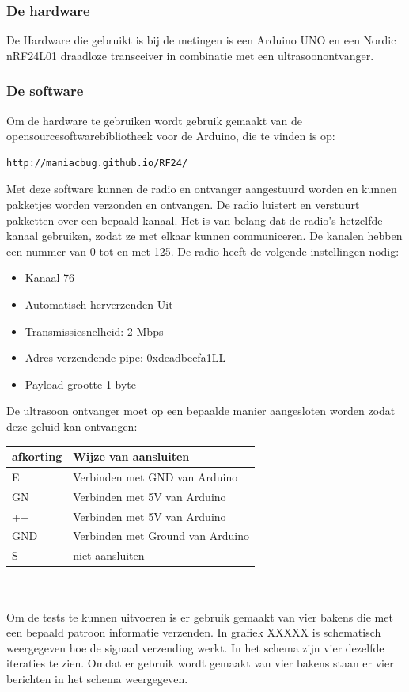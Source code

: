 \documentclass{article}
\begin{document}
\subsubsection{De hardware}
De Hardware die gebruikt is bij de metingen is een Arduino UNO en een Nordic nRF24L01 draadloze transceiver in combinatie met een ultrasoonontvanger. \\

\subsubsection{De software}
Om de hardware te gebruiken wordt gebruik gemaakt van de opensourcesoftwarebibliotheek voor de Arduino, die te vinden is op: \begin{verbatim}http://maniacbug.github.io/RF24/ \end{verbatim} 
Met deze software kunnen de radio en ontvanger aangestuurd worden en kunnen pakketjes worden verzonden en ontvangen. De radio luistert en verstuurt pakketten over een bepaald kanaal. Het is van belang dat de radio's hetzelfde kanaal gebruiken, zodat ze met elkaar kunnen communiceren. De kanalen hebben een nummer van 0 tot en met 125. De radio heeft de volgende instellingen nodig:
\begin{itemize}
	\item Kanaal 76 
	\item Automatisch herverzenden Uit
	\item Transmissiesnelheid: 2 Mbps
	\item Adres verzendende pipe: 0xdeadbeefa1LL
	\item Payload-grootte 1 byte
\end{itemize}
De ultrasoon ontvanger moet op een bepaalde manier aangesloten worden zodat deze geluid kan ontvangen:
\begin{tabular}{l| l}
\hline
afkorting & Wijze van aansluiten \\ \hline
E & Verbinden met GND van Arduino \\
GN & Verbinden met 5V van Arduino \\
++ & Verbinden met 5V van Arduino \\
GND & Verbinden met Ground van Arduino \\
S & niet aansluiten \\
\end{tabular}
\\
\\
Om de tests te kunnen uitvoeren is er gebruik gemaakt van vier bakens die met een bepaald patroon informatie verzenden. In grafiek  XXXXX is schematisch weergegeven hoe de signaal verzending werkt. In het schema zijn vier dezelfde iteraties te zien. Omdat er gebruik wordt gemaakt van vier bakens staan er vier berichten in het schema weergegeven. 
\end{document}
